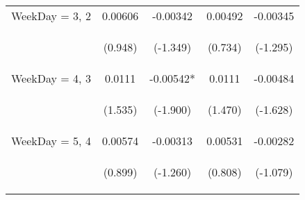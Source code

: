 \documentclass[]{article}
\begin{document}
\begin{center}
\begin{tabular}{lcccc}
        WeekDay = 3, 2   & 0.00606                                         & -0.00342                                       & 0.00492                                        & -0.00345                                       \\
        \vspace{4pt}     & \begin{footnotesize}(0.948)\end{footnotesize}   & \begin{footnotesize}(-1.349)\end{footnotesize} & \begin{footnotesize}(0.734)\end{footnotesize}  & \begin{footnotesize}(-1.295)\end{footnotesize} \\
        WeekDay = 4, 3   & 0.0111                                          & -0.00542*                                      & 0.0111                                         & -0.00484                                       \\
        \vspace{4pt}     & \begin{footnotesize}(1.535)\end{footnotesize}   & \begin{footnotesize}(-1.900)\end{footnotesize} & \begin{footnotesize}(1.470)\end{footnotesize}  & \begin{footnotesize}(-1.628)\end{footnotesize} \\
        WeekDay = 5, 4   & 0.00574                                         & -0.00313                                       & 0.00531                                        & -0.00282                                       \\
        \vspace{4pt}     & \begin{footnotesize}(0.899)\end{footnotesize}   & \begin{footnotesize}(-1.260)\end{footnotesize} & \begin{footnotesize}(0.808)\end{footnotesize}  & \begin{footnotesize}(-1.079)\end{footnotesize} \\

\end{tabular}
\end{center}
\end{document}
